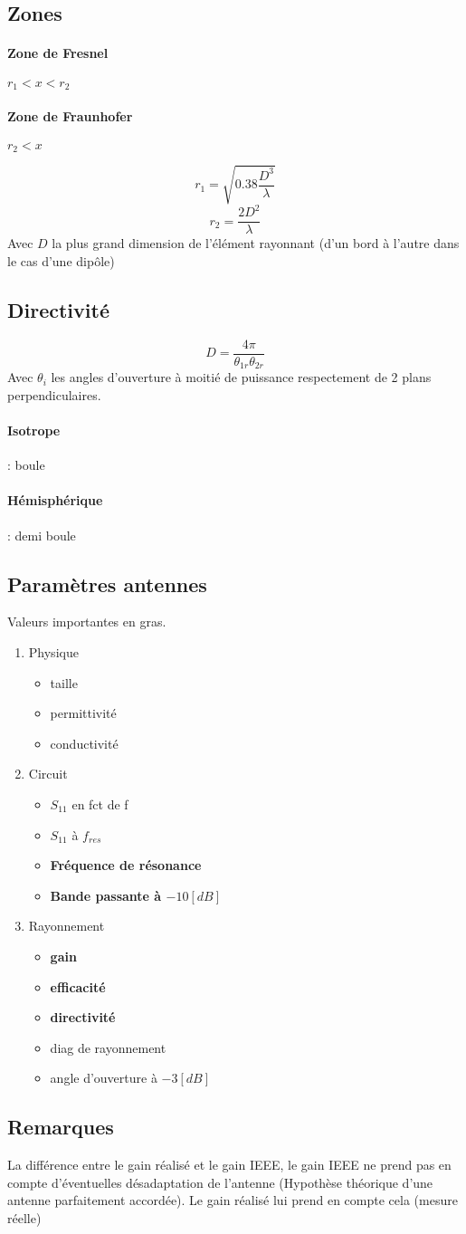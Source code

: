 \documentclass[resume]{subfiles}
\begin{document}
\subsection{Zones}
\paragraph{Zone de Fresnel} $r_1 < x < r_2$
\paragraph{Zone de Fraunhofer} $ r_2 < x$

$$r_1=\sqrt{0.38\frac{D^3}{\lambda}}$$
$$r_2=\frac{2D^2}{\lambda}$$
Avec $D$ la plus grand dimension de l'élément rayonnant (d'un bord à l'autre dans le cas d'une dipôle)
\subsection{Directivité}
$$D=\frac{4\pi}{\theta_{1r}\theta_{2r}}$$
Avec $\theta_i$ les angles d'ouverture à moitié de puissance respectement de 2 plans perpendiculaires.
\paragraph{Isotrope} : boule
\paragraph{Hémisphérique} : demi boule

\subsection{Paramètres antennes}
Valeurs importantes en gras.
\begin{enumerate}
\item Physique
	\begin{itemize}
	\item taille
	\item permittivité
	\item conductivité
	\end{itemize}
\item Circuit
	\begin{itemize}
	\item $S_{11}$ en fct de f
	\item $S_{11}$ à $f_{res}$
	\item \textbf{Fréquence de résonance}
	\item \textbf{Bande passante à $-10[dB]$}
	\end{itemize}
\item Rayonnement
	\begin{itemize}
	\item \textbf{gain}
	\item \textbf{efficacité}
	\item \textbf{directivité}
	\item diag de rayonnement
	\item angle d'ouverture à $-3[dB]$
	\end{itemize}
\end{enumerate}

\subsection{Remarques}
La différence entre le gain réalisé et le gain IEEE, le gain IEEE ne prend pas en compte d'éventuelles désadaptation de l'antenne (Hypothèse théorique d'une antenne parfaitement accordée). Le gain réalisé lui prend en compte cela (mesure réelle)
\end{document}
